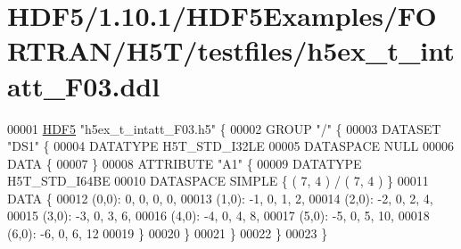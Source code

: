 \hypertarget{_h_d_f5_21_810_81_2_h_d_f5_examples_2_f_o_r_t_r_a_n_2_h5_t_2testfiles_2h5ex__t__intatt___f03_8ddl_source}{}\section{H\+D\+F5/1.10.1/\+H\+D\+F5\+Examples/\+F\+O\+R\+T\+R\+A\+N/\+H5\+T/testfiles/h5ex\+\_\+t\+\_\+intatt\+\_\+\+F03.ddl}
\label{_h_d_f5_21_810_81_2_h_d_f5_examples_2_f_o_r_t_r_a_n_2_h5_t_2testfiles_2h5ex__t__intatt___f03_8ddl_source}

\begin{DoxyCode}
00001 \hyperlink{namespace_h_d_f5}{HDF5} \textcolor{stringliteral}{"h5ex\_t\_intatt\_F03.h5"} \{
00002 GROUP \textcolor{stringliteral}{"/"} \{
00003    DATASET \textcolor{stringliteral}{"DS1"} \{
00004       DATATYPE  H5T\_STD\_I32LE
00005       DATASPACE  NULL
00006       DATA \{
00007       \}
00008       ATTRIBUTE \textcolor{stringliteral}{"A1"} \{
00009          DATATYPE  H5T\_STD\_I64BE
00010          DATASPACE  SIMPLE \{ ( 7, 4 ) / ( 7, 4 ) \}
00011          DATA \{
00012          (0,0): 0, 0, 0, 0,
00013          (1,0): -1, 0, 1, 2,
00014          (2,0): -2, 0, 2, 4,
00015          (3,0): -3, 0, 3, 6,
00016          (4,0): -4, 0, 4, 8,
00017          (5,0): -5, 0, 5, 10,
00018          (6,0): -6, 0, 6, 12
00019          \}
00020       \}
00021    \}
00022 \}
00023 \}
\end{DoxyCode}
